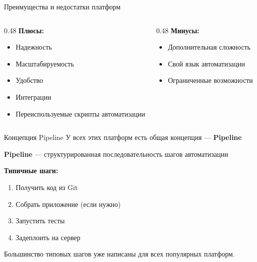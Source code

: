 \documentclass[aspectratio=169]{beamer}
\begin{document}
    \begin{frame}{Преимущества и недостатки платформ}
        \begin{columns}[t]
            \begin{column}[t]{0.48\textwidth}
                \textbf{Плюсы:}
                \begin{itemize}
                    \item {Надежность}
                    \item {Масштабируемость}
                    \item {Удобство}
                    \item {Интеграции}
                    \item Переиспользуемые скрипты автоматизации
                \end{itemize}
            \end{column}
            
            \begin{column}[t]{0.48\textwidth}
                \textbf{Минусы:}
                \begin{itemize}
                    \item {Дополнительная сложность}
                    \item {Свой язык автоматизации}
                    \item {Ограниченные возможности}
                \end{itemize}
            \end{column}
        \end{columns}
    \end{frame}

    \begin{frame}{Концепция Pipeline}
        У всех этих платформ есть общая концепция — \textbf{Pipeline}
        
        \vspace{0.2cm}
        
        \textbf{Pipeline} — структурированная последовательность шагов автоматизации
        
        \vspace{0.2cm}
        
        \textbf{Типичные шаги:}
        \begin{enumerate}
            \item Получить код из Git
            \item Собрать приложение (если нужно)
            \item Запустить тесты
            \item Задеплоить на сервер
        \end{enumerate}

        \vspace{0.2cm}
        Большинство типовых шагов уже написаны для всех популярных платформ.
        
    \end{frame}
\end{document}
